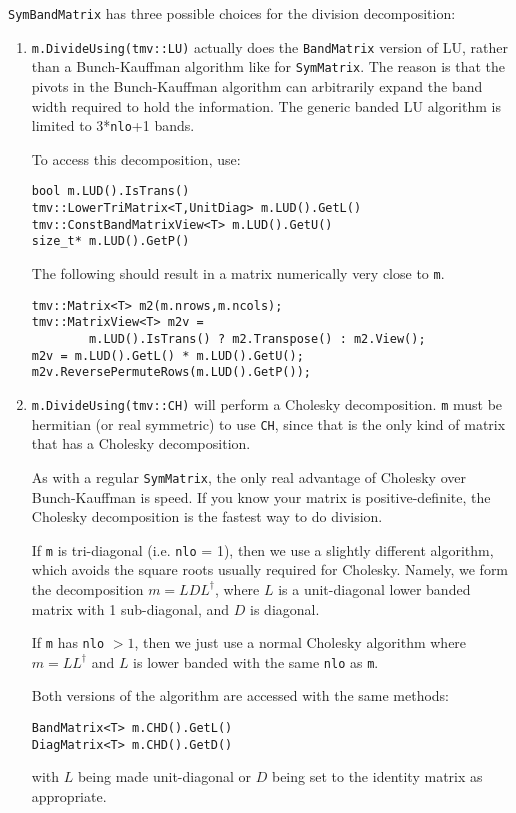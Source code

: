 \documentclass[twoside,letterpaper,11pt]{article}
\renewcommand{\tt}[1]{{\texttt {#1}}}
\begin{document}
\tt{SymBandMatrix} has three possible choices for the division decomposition:
\begin{enumerate}
\item
\tt{m.DivideUsing(tmv::LU)} actually does the \tt{BandMatrix} version of 
LU, rather than a Bunch-Kauffman algorithm like for \tt{SymMatrix}.  The
reason is that the pivots in the Bunch-Kauffman algorithm can arbitrarily
expand the band width required to hold the information.  The generic
banded LU algorithm is limited to 3*\tt{nlo}+1 bands.

To access this decomposition, use:
\begin{verbatim}
bool m.LUD().IsTrans()
tmv::LowerTriMatrix<T,UnitDiag> m.LUD().GetL()
tmv::ConstBandMatrixView<T> m.LUD().GetU()
size_t* m.LUD().GetP()
\end{verbatim}
The following should result in a matrix numerically very close to \tt{m}.
\begin{verbatim}
tmv::Matrix<T> m2(m.nrows,m.ncols);
tmv::MatrixView<T> m2v = 
        m.LUD().IsTrans() ? m2.Transpose() : m2.View();
m2v = m.LUD().GetL() * m.LUD().GetU();
m2v.ReversePermuteRows(m.LUD().GetP());
\end{verbatim}

\item
\tt{m.DivideUsing(tmv::CH)} will perform a Cholesky decomposition.  
\tt{m} must be hermitian (or real symmetric) to use \tt{CH}, since that is the
only kind of matrix that has a Cholesky decomposition.  

As with a regular \tt{SymMatrix},
the only real advantage of Cholesky over Bunch-Kauffman is speed.  If you know your 
matrix is positive-definite, the Cholesky decomposition is the fastest way to 
do division.

If \tt{m} is tri-diagonal (i.e. \tt{nlo} = 1), then we use a slightly 
different algorithm, which avoids the square roots usually required for 
Cholesky.  Namely, we form the decomposition $m = LDL^\dagger$, where $L$ is a
unit-diagonal lower banded matrix with 1 sub-diagonal, and $D$ is diagonal.

If \tt{m} has \tt{nlo} $> 1$, then we just use a normal Cholesky algorithm
where $m = LL^\dagger$ and $L$ is lower banded with the same \tt{nlo} as
\tt{m}.

Both versions of the algorithm are accessed with the same methods:
\begin{verbatim}
BandMatrix<T> m.CHD().GetL()
DiagMatrix<T> m.CHD().GetD()
\end{verbatim}
with $L$ being made unit-diagonal or $D$ being set to the identity matrix
as appropriate.


\end{enumerate}
\end{document}
